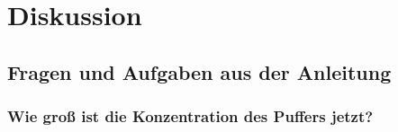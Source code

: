 \section{Diskussion}
\label{sec:diskussion}
\subsection{Fragen und Aufgaben aus der Anleitung}
\subsubsection{Wie groß ist die Konzentration des Puffers jetzt?}
